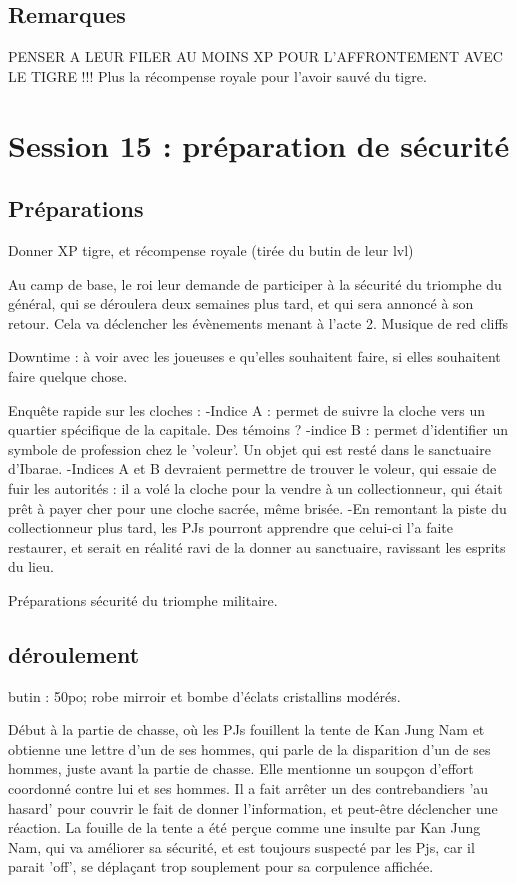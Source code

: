 \documentclass[10pt,a4paper]{book}
\begin{document}
\subsection{Remarques}
PENSER A LEUR FILER AU MOINS XP POUR L'AFFRONTEMENT AVEC LE TIGRE !!! Plus la récompense royale pour l'avoir sauvé du tigre.
\section{Session 15 : préparation de sécurité}
\subsection{Préparations}
Donner XP tigre, et récompense royale (tirée du butin de leur lvl)

Au camp de base, le roi leur demande de participer à la sécurité du triomphe du général, qui se déroulera deux semaines plus tard, et qui sera annoncé à son retour. Cela va déclencher les évènements menant à l'acte 2. Musique de red cliffs

Downtime : à voir avec les joueuses e qu'elles souhaitent faire, si elles souhaitent faire quelque chose.

Enquête rapide sur les cloches : 
-Indice A : permet de suivre la cloche vers un quartier spécifique de la capitale. Des témoins ?
-indice B : permet d'identifier un symbole de profession chez le 'voleur'. Un objet qui est resté dans le sanctuaire d'Ibarae.
-Indices A et B devraient permettre de trouver le voleur, qui essaie de fuir les autorités : il a volé la cloche pour la vendre à un collectionneur, qui était prêt à payer cher pour une cloche sacrée, même brisée.
-En remontant la piste du collectionneur plus tard, les PJs pourront apprendre que celui-ci l'a faite restaurer, et serait en réalité ravi de la donner au sanctuaire, ravissant les esprits du lieu.

Préparations sécurité du triomphe militaire.
\subsection{déroulement}
butin : 50po; robe mirroir et bombe d'éclats cristallins modérés.

Début à la partie de chasse, où les PJs fouillent la tente de Kan Jung Nam et obtienne une lettre d'un de ses hommes, qui parle de la disparition d'un de ses hommes, juste avant la partie de chasse. Elle mentionne un soupçon d'effort coordonné contre lui et ses hommes. Il a fait arrêter un des contrebandiers 'au hasard' pour couvrir le fait de donner l'information, et peut-être déclencher une réaction. La fouille de la tente a été perçue comme une insulte par Kan Jung Nam, qui va améliorer sa sécurité, et est toujours suspecté par les Pjs, car il parait 'off', se déplaçant trop souplement pour sa corpulence affichée.
\end{document}
